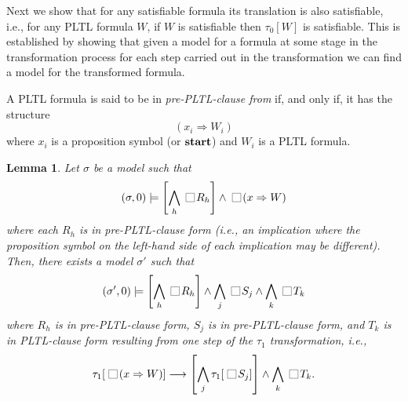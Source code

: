 \documentclass[nohyperref]{acmtrans2f}
\newcommand{\always}{\raisebox{-.2ex}{
                           \mbox{\unitlength=0.9ex
                           \begin{picture}(2,2)
                           \linethickness{0.06ex}
                           \put(0,0){\line(1,0){2}}
                           \put(0,2){\line(1,0){2}}
                           \put(0,0){\line(0,1){2}}
                           \put(2,0){\line(0,1){2}}
                           \end{picture}}}
                          \,}
\let\imp=\Rightarrow
\def\lstart{\hbox{\rm\bf start}}
\newtheorem{seclemma}{Lemma}[section]
\begin{document}
Next we show that for any satisfiable formula its translation is also
satisfiable, i.e., for any PLTL formula $W$, if $W$ is satisfiable then
$\tau_0[W]$ is satisfiable. This is established by showing that given a
model for a formula at some stage in the 
transformation process
for each step carried out in the
transformation we can find a model for the transformed formula.
%
\begin{secdefn}
A PLTL formula is said to be in {\em pre-PLTL-clause from\/} if, and only if,
it has the structure
$$
(x_i \imp W_i)
$$
where $x_i$ is a proposition symbol (or $\lstart$) and $W_i$ is a PLTL formula.
\end{secdefn}
\begin{seclemma}
\label{lem.one.step}
Let $\sigma$ be a model such that 
$$(\sigma,0) \models \left[\bigwedge_h \always R_h\right] \land
 \always(x \imp W)$$
%
where each $R_h$ is in pre-PLTL-clause form (i.e., an implication where the
proposition symbol on the left-hand side of each implication may be different). Then, there
exists a model $\sigma'$ such that
%
$$(\sigma',0) \models\left[ \bigwedge_h \always R_h\right] \land
\bigwedge_j \always S_j \land \bigwedge_k \always T_k$$
%
where $R_h$ is in pre-PLTL-clause form, $S_j$ is in pre-PLTL-clause form, and $T_k$
is in PLTL-clause form resulting from one step of the $\tau_1$
transformation, i.e.,
$$
\tau_1[\always (x \imp W)] \longrightarrow \left[\bigwedge_j
\tau_1[\always S_j]\right] \land \bigwedge_k \always T_k.
$$
\end{seclemma}
\end{document}
